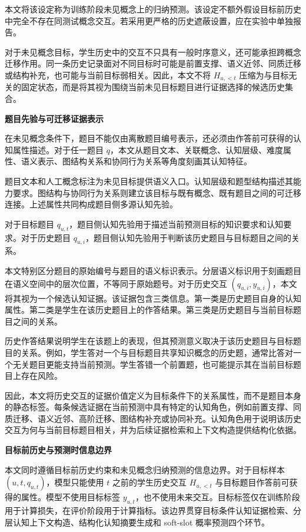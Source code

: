 \documentclass[UTF8,a4paper,12pt]{ctexart}
\numberwithin{table}{section}
\begin{document}
本文将该设定称为训练阶段未见概念上的归纳预测。该设定不额外假设目标前历史中完全不存在同测试概念交互。若采用更严格的历史遮蔽设置，应在实验中单独报告。



对于未见概念目标，学生历史中的交互不只具有一般时序意义，还可能承担跨概念迁移作用。同一条历史记录面对不同目标时可能是前置支撑、语义近邻、同质迁移或结构补充，也可能与当前目标弱相关。因此，本文不将 \(H_{u,<t}\) 压缩为与目标无关的固定状态，而是将其视为围绕当前未见目标题目进行证据选择的候选历史集合。

\noindent\textbf{题目先验与可迁移证据表示}



在未见概念条件下，题目不能仅由离散题目编号表示，还必须由作答前可获得的认知属性描述。对于任一题目 \(q\)，本文从题目文本、关联概念、认知层级、难度属性、语义表示、图结构关系和协同行为关系等角度刻画其认知特征。

题目文本和人工概念标注为未见目标提供语义入口。认知层级和题型结构描述其能力要求。图结构与协同行为关系则建立该目标与既有概念、既有题目之间的可迁移连接。上述属性共同构成题目侧多源认知先验。

对于目标题目 \(q_{u,t}\)，题目侧认知先验用于描述当前预测目标的知识要求和认知要求。对于历史题目 \(q_{u,i}\)，题目侧认知先验用于判断该历史题目与目标题目之间的关系。

本文特别区分题目的原始编号与题目的语义标识表示。分层语义标识用于刻画题目在语义空间中的层次位置，不等同于原始题号。对于历史交互 \((q_{u,i},y_{u,i})\)，本文将其视为一个候选认知证据。该证据包含三类信息。第一类是历史题目自身的认知属性。第二类是学生在该历史题目上的作答结果。第三类是历史题目与当前目标题目之间的关系。

历史作答结果说明学生在该题上的表现，但其预测意义取决于该历史题目与目标题目的关系。例如，学生答对一个与目标题目共享知识概念的历史题，通常比答对一个无关题目更能支持当前预测。学生答错一个前置题，也可能提示其在当前目标题目上存在风险。

因此，本文将历史交互的证据价值定义为目标条件下的关系属性，而不是题目本身的静态标签。每条候选证据在当前预测中具有特定的认知角色，例如前置支撑、同质迁移、语义近邻、高阶迁移、图结构补充或协同补充。认知角色用于说明该历史交互为何与当前目标题目相关，并为后续证据检索和上下文构造提供结构化依据。

\noindent\textbf{目标前历史与预测时信息边界}



本文同时遵循目标前历史约束和未见概念归纳预测的信息边界。对于目标样本 \((u,t,q_{u,t})\)，模型只能使用 \(t\) 之前的学生历史交互 \(H_{u,<t}\) 与目标题目作答前可获得的属性。模型不使用目标标签 \(y_{u,t}\)，也不使用未来交互。目标标签仅在训练阶段用于计算损失，在评价阶段用于计算指标。该边界贯穿目标条件认知证据检索、分层认知上下文构造、结构化认知摘要生成和 soft-slot 概率预测四个环节。
\end{document}
